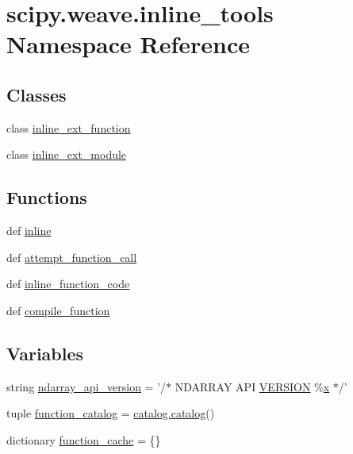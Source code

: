 \hypertarget{namespacescipy_1_1weave_1_1inline__tools}{}\section{scipy.\+weave.\+inline\+\_\+tools Namespace Reference}
\label{namespacescipy_1_1weave_1_1inline__tools}
\subsection*{Classes}
\begin{DoxyCompactItemize}
\item 
class \hyperlink{classscipy_1_1weave_1_1inline__tools_1_1inline__ext__function}{inline\+\_\+ext\+\_\+function}
\item 
class \hyperlink{classscipy_1_1weave_1_1inline__tools_1_1inline__ext__module}{inline\+\_\+ext\+\_\+module}
\end{DoxyCompactItemize}
\subsection*{Functions}
\begin{DoxyCompactItemize}
\item 
def \hyperlink{namespacescipy_1_1weave_1_1inline__tools_aaada6afeb5b2214ee7f2d1fa668485cf}{inline}
\item 
def \hyperlink{namespacescipy_1_1weave_1_1inline__tools_aa41260d92fda39822e73185a023e699e}{attempt\+\_\+function\+\_\+call}
\item 
def \hyperlink{namespacescipy_1_1weave_1_1inline__tools_a0648335e897ea2ef53d6f1b6c15c4073}{inline\+\_\+function\+\_\+code}
\item 
def \hyperlink{namespacescipy_1_1weave_1_1inline__tools_a34ae767664f1e53352926c7609d2db2f}{compile\+\_\+function}
\end{DoxyCompactItemize}
\subsection*{Variables}
\begin{DoxyCompactItemize}
\item 
string \hyperlink{namespacescipy_1_1weave_1_1inline__tools_abf82f23f9d14ab26df489f88195a6d4a}{ndarray\+\_\+api\+\_\+version} = '/$\ast$ N\+D\+A\+R\+R\+A\+Y A\+P\+I \hyperlink{i2c-tools-3_81_81_2version_8h_a1c6d5de492ac61ad29aec7aa9a436bbf}{V\+E\+R\+S\+I\+O\+N} \%\hyperlink{vecnorm1_8cc_ac73eed9e41ec09d58f112f06c2d6cb63}{x} $\ast$/'
\item 
tuple \hyperlink{namespacescipy_1_1weave_1_1inline__tools_aa5549969e3a8b4f886bca72accc947ed}{function\+\_\+catalog} = \hyperlink{classscipy_1_1weave_1_1catalog_1_1catalog}{catalog.\+catalog}()
\item 
dictionary \hyperlink{namespacescipy_1_1weave_1_1inline__tools_a57d23b833b50f5486901309ea6c5d4ef}{function\+\_\+cache} = \{\}
\end{DoxyCompactItemize}


